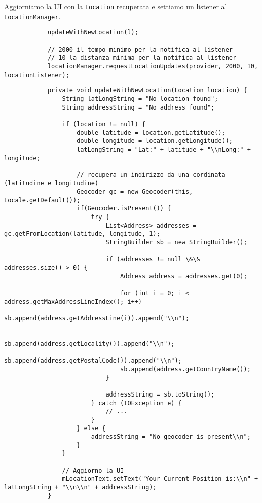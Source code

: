 		Aggiorniamo la UI con la \lstinline|Location| recuperata e settiamo un listener al \lstinline|LocationManager|.
		\begin{lstlisting}
			updateWithNewLocation(l);
			
			// 2000 il tempo minimo per la notifica al listener
			// 10 la distanza minima per la notifica al listener
			locationManager.requestLocationUpdates(provider, 2000, 10, locationListener);
		\end{lstlisting}
		\begin{lstlisting}
			private void updateWithNewLocation(Location location) {				
				String latLongString = "No location found";
				String addressString = "No address found";
				
				if (location != null) {
					double latitude = location.getLatitude();
					double longitude = location.getLongitude();
					latLongString = "Lat:" + latitude + "\\nLong:" + longitude;
					
					// recupera un indirizzo da una cordinata (latitudine e longitudine)
					Geocoder gc = new Geocoder(this, Locale.getDefault());
					if(Geocoder.isPresent()) {
						try {
							List<Address> addresses = gc.getFromLocation(latitude, longitude, 1);
							StringBuilder sb = new StringBuilder();
							
							if (addresses != null \&\& addresses.size() > 0) {
								Address address = addresses.get(0);
							
								for (int i = 0; i < address.getMaxAddressLineIndex(); i++)
									sb.append(address.getAddressLine(i)).append("\\n");
								
								sb.append(address.getLocality()).append("\\n");
								sb.append(address.getPostalCode()).append("\\n");
								sb.append(address.getCountryName());
							}
							
							addressString = sb.toString();
						} catch (IOException e) {
							// ...
						}
					} else {
						addressString = "No geocoder is present\\n";
					}
				}
				
				// Aggiorno la UI
				mLocationText.setText("Your Current Position is:\\n" + latLongString + "\\n\\n" + addressString);
			}
		\end{lstlisting}
		
